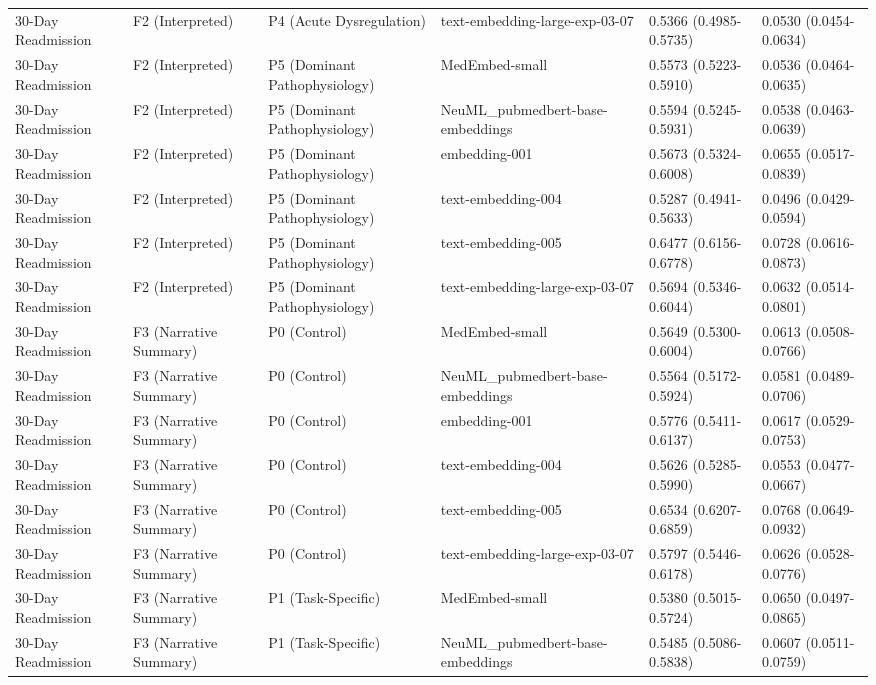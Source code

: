 \begin{tabular}{llllll}
30-Day Readmission & F2 (Interpreted) & P4 (Acute Dysregulation) & text-embedding-large-exp-03-07 & 0.5366 (0.4985-0.5735) & 0.0530 (0.0454-0.0634) \\
30-Day Readmission & F2 (Interpreted) & P5 (Dominant Pathophysiology) & MedEmbed-small & 0.5573 (0.5223-0.5910) & 0.0536 (0.0464-0.0635) \\
30-Day Readmission & F2 (Interpreted) & P5 (Dominant Pathophysiology) & NeuML\_pubmedbert-base-embeddings & 0.5594 (0.5245-0.5931) & 0.0538 (0.0463-0.0639) \\
30-Day Readmission & F2 (Interpreted) & P5 (Dominant Pathophysiology) & embedding-001 & 0.5673 (0.5324-0.6008) & 0.0655 (0.0517-0.0839) \\
30-Day Readmission & F2 (Interpreted) & P5 (Dominant Pathophysiology) & text-embedding-004 & 0.5287 (0.4941-0.5633) & 0.0496 (0.0429-0.0594) \\
30-Day Readmission & F2 (Interpreted) & P5 (Dominant Pathophysiology) & text-embedding-005 & 0.6477 (0.6156-0.6778) & 0.0728 (0.0616-0.0873) \\
30-Day Readmission & F2 (Interpreted) & P5 (Dominant Pathophysiology) & text-embedding-large-exp-03-07 & 0.5694 (0.5346-0.6044) & 0.0632 (0.0514-0.0801) \\
30-Day Readmission & F3 (Narrative Summary) & P0 (Control) & MedEmbed-small & 0.5649 (0.5300-0.6004) & 0.0613 (0.0508-0.0766) \\
30-Day Readmission & F3 (Narrative Summary) & P0 (Control) & NeuML\_pubmedbert-base-embeddings & 0.5564 (0.5172-0.5924) & 0.0581 (0.0489-0.0706) \\
30-Day Readmission & F3 (Narrative Summary) & P0 (Control) & embedding-001 & 0.5776 (0.5411-0.6137) & 0.0617 (0.0529-0.0753) \\
30-Day Readmission & F3 (Narrative Summary) & P0 (Control) & text-embedding-004 & 0.5626 (0.5285-0.5990) & 0.0553 (0.0477-0.0667) \\
30-Day Readmission & F3 (Narrative Summary) & P0 (Control) & text-embedding-005 & 0.6534 (0.6207-0.6859) & 0.0768 (0.0649-0.0932) \\
30-Day Readmission & F3 (Narrative Summary) & P0 (Control) & text-embedding-large-exp-03-07 & 0.5797 (0.5446-0.6178) & 0.0626 (0.0528-0.0776) \\
30-Day Readmission & F3 (Narrative Summary) & P1 (Task-Specific) & MedEmbed-small & 0.5380 (0.5015-0.5724) & 0.0650 (0.0497-0.0865) \\
30-Day Readmission & F3 (Narrative Summary) & P1 (Task-Specific) & NeuML\_pubmedbert-base-embeddings & 0.5485 (0.5086-0.5838) & 0.0607 (0.0511-0.0759) \\

\end{tabular}
